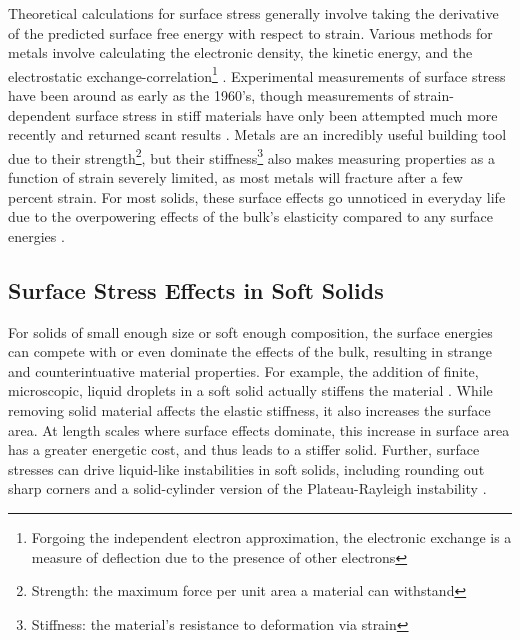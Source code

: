 Theoretical calculations for surface stress generally involve taking the derivative of the predicted surface free energy with respect to strain. Various methods for metals involve calculating the electronic density, the kinetic energy, and the electrostatic exchange-correlation\footnote{Forgoing the independent electron approximation, the electronic exchange is a measure of deflection due to the presence of other electrons} \cite{GURTIN1978431}. Experimental measurements of surface stress have been around as early as the 1960's, though measurements of strain-dependent surface stress in stiff materials have only been attempted much more recently and returned scant results \cite{mays1968surface,wasserman1970determination,hanneman1962elastic,martinez1990direct,schell1990mechanical}. Metals are an incredibly useful building tool due to their strength\footnote{Strength: the maximum force per unit area a material can withstand}, but their stiffness\footnote{Stiffness: the material's resistance to deformation via strain} also makes measuring properties as a function of strain severely limited, as most metals will fracture after a few percent strain. For most solids, these surface effects go unnoticed in everyday life due to the overpowering effects of the bulk's elasticity compared to any surface energies \cite{miller2000size,dingreville2005surface,duan2005eshelby,sharma2004size,he2008surface,lu2014towards}.



\subsection{Surface Stress Effects in Soft Solids}
For solids of small enough size or soft enough composition, the surface energies can compete with or even dominate the effects of the bulk, resulting in strange and counterintuative material properties. For example, the addition of finite, microscopic, liquid droplets in a soft solid actually stiffens the material \cite{style2015stiffening}. While removing solid material affects the elastic stiffness, it also increases the surface area. At length scales where surface effects dominate, this increase in surface area has a greater energetic cost, and thus leads to a stiffer solid. Further, surface stresses can drive liquid-like instabilities in soft solids, including rounding out sharp corners \cite{mora2015softening} and a solid-cylinder version of the Plateau-Rayleigh instability \cite{mora2010capillarity}.

